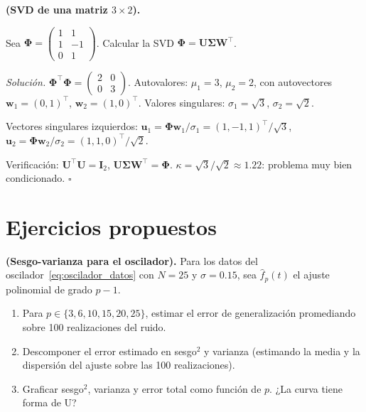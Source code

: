 \begin{ejercicio}
\label{ej:svd_pequeña}
\textbf{(SVD de una matriz $3 \times 2$).}

Sea $\bm{\Phi} = \begin{pmatrix} 1 & 1 \\ 1 & -1 \\ 0 & 1
\end{pmatrix}$. Calcular la SVD $\bm{\Phi} =
\bm{U}\bm{\Sigma}\bm{W}^\top$.

\medskip\noindent\textit{Solución.}
$\bm{\Phi}^\top\bm{\Phi} = \begin{pmatrix} 2 & 0 \\ 0 & 3
\end{pmatrix}$. Autovalores: $\mu_1 = 3$, $\mu_2 = 2$, con
autovectores $\bm{w}_1 = (0,1)^\top$, $\bm{w}_2 = (1,0)^\top$.
Valores singulares: $\sigma_1 = \sqrt{3}$, $\sigma_2 = \sqrt{2}$.

Vectores singulares izquierdos:
$\bm{u}_1 = \bm{\Phi}\bm{w}_1/\sigma_1 =
(1,-1,1)^\top/\sqrt{3}$,
$\bm{u}_2 = \bm{\Phi}\bm{w}_2/\sigma_2 =
(1,1,0)^\top/\sqrt{2}$.

Verificación: $\bm{U}^\top\bm{U} = \bm{I}_2$,
$\bm{U}\bm{\Sigma}\bm{W}^\top = \bm{\Phi}$.
$\kappa = \sqrt{3}/\sqrt{2} \approx 1.22$: problema muy bien
condicionado. $\square$
\end{ejercicio}

\section*{Ejercicios propuestos}

\begin{ejercicio}
\label{ej:biasvar_polinomial}
\textbf{(Sesgo-varianza para el oscilador).}
Para los datos del oscilador~\eqref{eq:oscilador_datos} con $N = 25$
y $\sigma = 0.15$, sea $\hat{f}_p(t)$ el ajuste polinomial de grado
$p - 1$.
\begin{enumerate}[label=(\alph*)]
  \item Para $p \in \{3, 6, 10, 15, 20, 25\}$, estimar el error de
        generalización promediando sobre 100 realizaciones del ruido.
  \item Descomponer el error estimado en sesgo$^2$ y varianza
        (estimando la media y la dispersión del ajuste sobre las 100
        realizaciones).
  \item Graficar sesgo$^2$, varianza y error total como función de $p$.
        ¿La curva tiene forma de U?
\end{enumerate}
\end{ejercicio}


